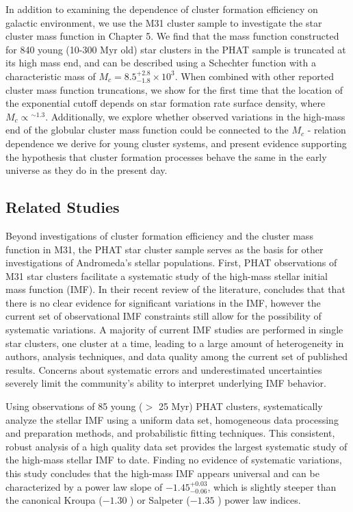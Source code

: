 \documentclass[11pt, titlepage, twoside]{article}
\begin{document}
In addition to examining the dependence of cluster formation efficiency on galactic environment, we use the M31 cluster sample to investigate the star cluster mass function in Chapter 5. We find that the mass function constructed for 840 young (10-300 Myr old) star clusters in the PHAT sample is truncated at its high mass end, and can be described using a Schechter function with a characteristic mass of $M_c = 8.5^{+2.8}_{-1.8} \times 10^3$. When combined with other reported cluster mass function truncations, we show for the first time that the location of the exponential cutoff depends on star formation rate surface density, where $M_c \propto$$^{\sim1.3}$. Additionally, we explore whether observed variations in the high-mass end of the globular cluster mass function could be connected to the $M_c$ - relation dependence we derive for young cluster systems, and present evidence supporting the hypothesis that cluster formation processes behave the same in the early universe as they do in the present day.


\subsection{Related Studies}\label{MPSection:552D75A9-2935-4230-B8AF-A90F2A394CDF}

Beyond investigations of cluster formation efficiency and the cluster mass function in M31, the PHAT star cluster sample serves as the basis for other investigations of Andromeda's stellar populations. First, PHAT observations of M31 star clusters facilitate a systematic study of the high-mass stellar initial mass function (IMF). In their recent review of the literature, concludes that that there is no clear evidence for significant variations in the IMF, however the current set of observational IMF constraints still allow for the possibility of systematic variations. A majority of current IMF studies are performed in single star clusters, one cluster at a time, leading to a large amount of heterogeneity in authors, analysis techniques, and data quality among the current set of published results. Concerns about systematic errors and underestimated uncertainties severely limit the community's ability to interpret underlying IMF behavior.

Using observations of 85 young ($>$ 25 Myr) PHAT clusters, systematically analyze the stellar IMF using a uniform data set, homogeneous data processing and preparation methods, and probabilistic fitting techniques. This consistent, robust analysis of a high quality data set provides the largest systematic study of the high-mass stellar IMF to date. Finding no evidence of systematic variations, this study concludes that the high-mass IMF appears universal and can be characterized by a power law slope of $-1.45^{+0.03}_{-0.06}$, which is slightly steeper than the canonical Kroupa ($-1.30$ ) or Salpeter ($-1.35$ ) power law indices.
\end{document}
